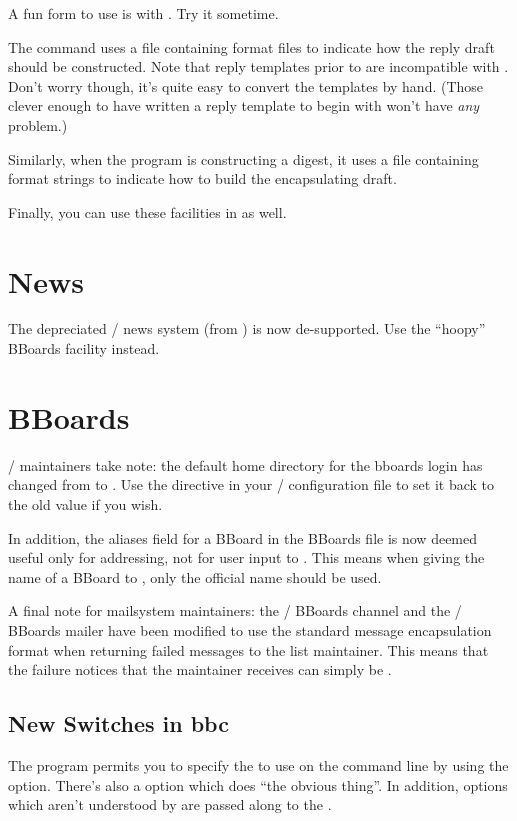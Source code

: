 A fun form to use is  with .
Try it sometime.


The  command uses a file containing format files to
indicate how the reply draft should be constructed.
Note that reply templates prior to  are incompatible with .%
Don't worry though,
it's quite easy to convert the templates by hand.
(Those clever enough to have written a reply template to begin with won't
have {\em any\/} problem.)

Similarly, when the  program is constructing a digest,
it uses a file containing format strings to indicate how to build the
encapsulating draft.

Finally, you can use these facilities in  as well.

\section*	{News}
The depreciated \MH/ news system (from ) is now de-supported.
Use the ``hoopy'' BBoards facility instead.

\section*	{BBoards}
\MH/ maintainers take note:
the default home directory for the bboards login has changed from
 to .
Use the  directive in your \MH/ configuration file to set
it back to the old value if you wish.

In addition, the aliases field for a BBoard in the BBoards file is now
deemed useful only for addressing, not for user input to .
This means when giving the name of a BBoard to ,
only the official name should be used.

A final note for mailsystem maintainers:
the \MMDFII/ BBoards channel and the \SendMail/ BBoards mailer have been
modified to use the standard message encapsulation format when returning
failed messages to the list maintainer.
This means that the failure notices that the maintainer receives can
simply be .

\subsection*	{New Switches in bbc}
The  program permits you to specify the  to use on the
command line by using the  option.
There's also a  option which does ``the obvious thing''.
In addition, options which aren't understood by  are passed along to
the .

